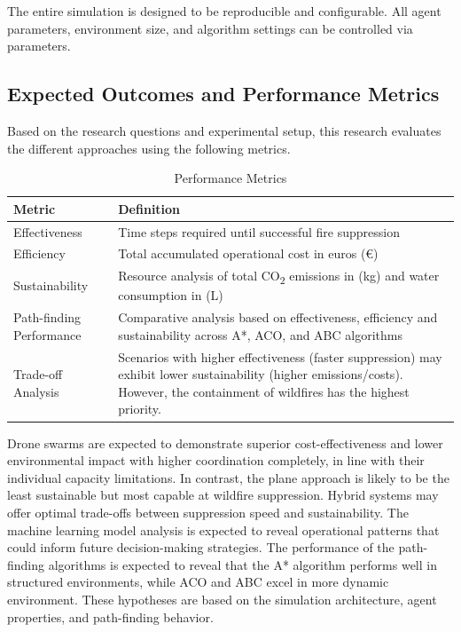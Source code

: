 \documentclass[11pt, a4paper]{article}
\begin{document}
The entire simulation is designed to be reproducible and configurable. All agent parameters, environment size, and algorithm settings can be controlled via parameters.

\subsection{Expected Outcomes and Performance Metrics}
Based on the research questions and experimental setup, this research evaluates the different approaches using the following metrics.
\begin{table}[h!]
\centering
\begin{tabular}{|l|p{10cm}|}
\hline
\textbf{Metric} & \textbf{Definition}\\
\hline
Effectiveness & Time steps required until successful fire suppression \\
\hline
Efficiency & Total accumulated operational cost in euros (€) \\
\hline
Sustainability & Resource analysis of total CO\textsubscript{2} emissions in (kg) and water consumption in (L)  \\
\hline
Path-finding Performance & Comparative analysis based on effectiveness, efficiency and sustainability across A*, ACO, and ABC algorithms\\
\hline
Trade-off Analysis & Scenarios with higher effectiveness (faster suppression) may exhibit lower sustainability (higher emissions/costs). However, the containment of wildfires has the highest priority. \\
\hline
\end{tabular}
\caption{Performance Metrics}
\end{table}

Drone swarms are expected to demonstrate superior cost-effectiveness and lower environmental impact with higher coordination completely, in line with their individual capacity limitations. In contrast, the plane approach is likely to be the least sustainable but most capable at wildfire suppression. Hybrid systems may offer optimal trade-offs between suppression speed and sustainability. The machine learning model analysis is expected to reveal operational patterns that could inform future decision-making strategies. The performance of the path-finding algorithms is expected to reveal that the A* algorithm performs well in structured environments, while ACO and ABC excel in more dynamic environment. These hypotheses are based on the 
simulation architecture, agent properties, and path-finding behavior.
\end{document}

